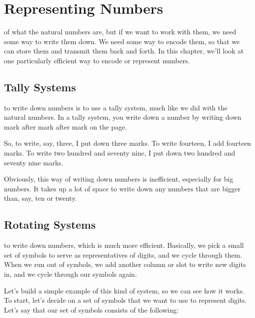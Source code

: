 \documentclass[../../../main.tex]{subfiles}
\begin{document}
\chapter{Representing Numbers}
\label{ch:representing-numbers}

 of what the natural numbers are, but if we want to work with them, we need some way to write them down. We need some way to encode them, so that we can store them and transmit them back and forth. In this chapter, we'll look at one particularly efficient way to encode or represent numbers.


\section{Tally Systems}

 to write down numbers is to use a tally system, much like we did with the natural numbers. In a tally system, you write down a number by writing down mark after mark after mark on the page. 

So, to write, say, three, I put down three marks. To write fourteen, I add fourteen marks. To write two hundred and seventy nine, I put down two hundred and seventy nine marks.

Obviously, this way of writing down numbers is inefficient, especially for big numbers. It takes up a lot of space to write down any numbers that are bigger than, say, ten or twenty.


\section{Rotating Systems}

 to write down numbers, which is much more efficient. Basically, we pick a small set of symbols to serve as representatives of digits, and we cycle through them. When we run out of symbols, we add another column or slot to write new digits in, and we cycle through our symbols again.

Let's build a simple example of this kind of system, so we can see how it works. To start, let's decide on a set of symbols that we want to use to represent digits. Let's say that our set of symbols consists of the following:
\end{document}

